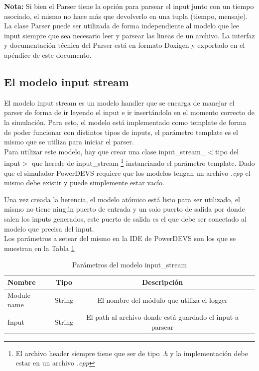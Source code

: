 \documentclass[10pt,a4paper]{article}
\begin{document}
\textbf{Nota:} Si bien el Parser tiene la opción para parsear el input junto con un tiempo asociado, el mismo no hace más que devolverlo en una tupla (tiempo, mensaje).\\

La clase Parser puede ser utilizada de forma independiente al modelo que lee input siempre que sea necesario leer y parsear las lineas de un archivo. La interfaz y documentación técnica del Parser está en formato Doxigen y exportado en el apéndice de este documento.

\newpage

\subsection{El modelo input stream}

El modelo input stream es un modelo handler que se encarga de manejar el parser de forma de ir leyendo el input e ir insertándolo en el momento correcto de la simulación. Para esto, el modelo está implementado como template de forma de poder funcionar con distintos tipos de inputs, el parámetro template es el mismo que se utiliza para iniciar el parser. \\

Para utilizar este modelo, hay que crear una clase input\_stream\_$<$tipo del input$>$ que herede de input\_stream \footnote{El archivo header siempre tiene que ser de tipo \textit{.h} y la implementación debe estar en un archivo \textit{.cpp}} instanciando el parámetro template. Dado que el simulador PowerDEVS requiere que los modelos tengan un archivo \textit{.cpp} el mismo debe existir y puede simplemente estar vacío.

Una vez creada la herencia, el modelo atómico está listo para ser utilizado, el mismo no tiene ningún puerto de entrada y un solo puerto de salida por donde salen los inputs generados, este puerto de salida es el que debe ser conectado al modelo que precisa del input. \\

Los parámetros a setear del mismo en la IDE de PowerDEVS son los que se muestran en la Tabla \ref{table: input stream parameters}
\begin{table}[h]
\begin{tabular}{|l|c|c|c|}
  \hline
  \textbf{Nombre} & \textbf{Tipo} & \textbf{Descripción} \\
  \hline
  Module name & String & El nombre del módulo que utiliza el logger \\
  \hline
  Input & String & El path al archivo donde está guardado el input a parsear \\
  \hline
\end{tabular}
\caption{Parámetros del modelo input\_stream}
\label{table: input stream parameters}
\end{table}
\end{document}
